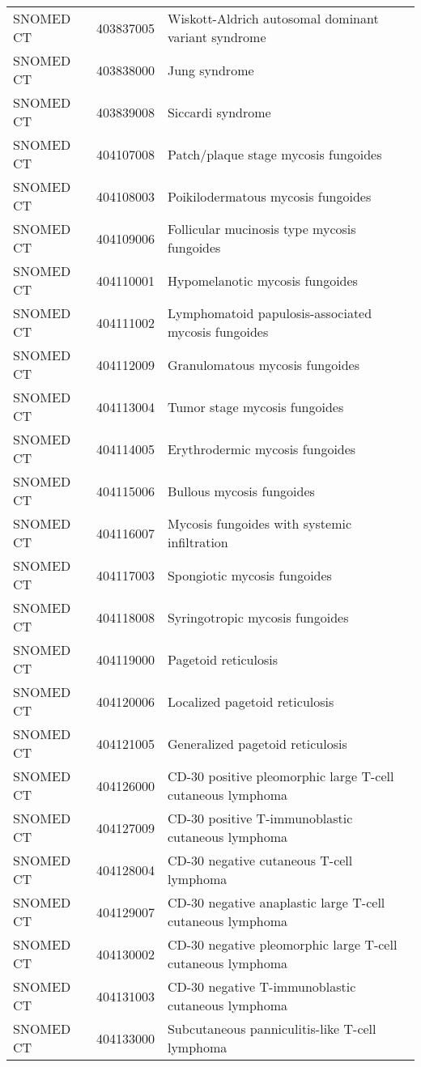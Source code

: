 \begin{longtable}{p{}p{}p{}}
  SNOMED CT & 403837005 & Wiskott-Aldrich autosomal dominant variant syndrome \\ 
  SNOMED CT & 403838000 & Jung syndrome \\ 
  SNOMED CT & 403839008 & Siccardi syndrome \\ 
  SNOMED CT & 404107008 & Patch/plaque stage mycosis fungoides \\ 
  SNOMED CT & 404108003 & Poikilodermatous mycosis fungoides \\ 
  SNOMED CT & 404109006 & Follicular mucinosis type mycosis fungoides \\ 
  SNOMED CT & 404110001 & Hypomelanotic mycosis fungoides \\ 
  SNOMED CT & 404111002 & Lymphomatoid papulosis-associated mycosis fungoides \\ 
  SNOMED CT & 404112009 & Granulomatous mycosis fungoides \\ 
  SNOMED CT & 404113004 & Tumor stage mycosis fungoides \\ 
  SNOMED CT & 404114005 & Erythrodermic mycosis fungoides \\ 
  SNOMED CT & 404115006 & Bullous mycosis fungoides \\ 
  SNOMED CT & 404116007 & Mycosis fungoides with systemic infiltration \\ 
  SNOMED CT & 404117003 & Spongiotic mycosis fungoides \\ 
  SNOMED CT & 404118008 & Syringotropic mycosis fungoides \\ 
  SNOMED CT & 404119000 & Pagetoid reticulosis \\ 
  SNOMED CT & 404120006 & Localized pagetoid reticulosis \\ 
  SNOMED CT & 404121005 & Generalized pagetoid reticulosis \\ 
  SNOMED CT & 404126000 & CD-30 positive pleomorphic large T-cell cutaneous lymphoma \\ 
  SNOMED CT & 404127009 & CD-30 positive T-immunoblastic cutaneous lymphoma \\ 
  SNOMED CT & 404128004 & CD-30 negative cutaneous T-cell lymphoma \\ 
  SNOMED CT & 404129007 & CD-30 negative anaplastic large T-cell cutaneous lymphoma \\ 
  SNOMED CT & 404130002 & CD-30 negative pleomorphic large T-cell cutaneous lymphoma \\ 
  SNOMED CT & 404131003 & CD-30 negative T-immunoblastic cutaneous lymphoma \\ 
  SNOMED CT & 404133000 & Subcutaneous panniculitis-like T-cell lymphoma \\ 

\end{longtable}
